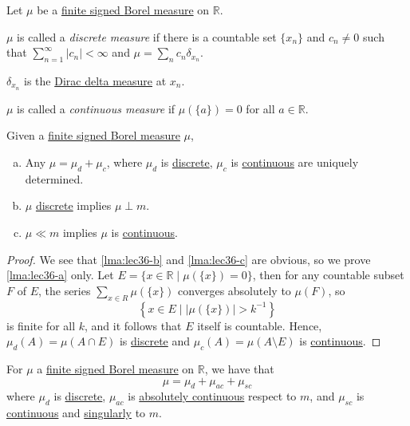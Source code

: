 \begin{definition*}
	Let \(\mu\) be a \hyperref[def:finite-signed-measure]{finite signed \hyperref[def:Borel-measure]{Borel measure}} on \(\mathbb{R}\).
	\begin{definition}\label{def:discrete-measure}
		\(\mu\) is called a \emph{discrete measure} if there is a countable set \(\{x_n\}\) and \(c_n \neq 0\) such that \(\sum_{n=1}^\infty \left\vert c_n \right\vert < \infty\)
		and \(\mu = \sum_n c_n \delta_{x_n}\).
		\begin{note}
			\(\delta_{x_n}\) is the \hyperref[eg:Dirac-delta-measure]{Dirac delta measure} at \(x_n\).
		\end{note}
	\end{definition}
	\begin{definition}\label{def:continuous-measure}
		\(\mu\) is called a \emph{continuous measure} if \(\mu(\{a\}) = 0\) for all \(a \in \mathbb{R}\).
	\end{definition}
\end{definition*}

\begin{lemma}\label{lma:lec36}
	Given a \hyperref[def:finite-signed-measure]{finite signed \hyperref[def:Borel-measure]{Borel measure}} \(\mu\),
	\begin{enumerate}[(a)]
		\item\label{lma:lec36-a} Any \(\mu = \mu_d + \mu_c\), where \(\mu_d\) is \hyperref[def:discrete-measure]{discrete}, \(\mu_c\) is \hyperref[def:continuous-measure]{continuous} are uniquely determined.
		\item\label{lma:lec36-b} \(\mu\) \hyperref[def:discrete-measure]{discrete} implies \(\mu \perp m\).
		\item\label{lma:lec36-c} \(\mu \ll m\) implies \(\mu\) is \hyperref[def:continuous-measure]{continuous}.
	\end{enumerate}
\end{lemma}
\begin{proof}
	We see that \autoref{lma:lec36-b} and \autoref{lma:lec36-c} are obvious, so we prove \autoref{lma:lec36-a} only. Let \(E = \{x\in \mathbb{R} \mid \mu (\{x\}) = 0\}\), then for any countable subset \(F\) of \(E\), the series \(\sum_{x\in R}^{} \mu (\{x\})\) converges absolutely to \(\mu (F)\), so
	\[
		\left\{x\in E\mid \left\vert \mu (\{x\}) \right\vert > k^{-1} \right\}
	\]
	is finite for all \(k\), and it follows that \(E\) itself is countable. Hence, \(\mu _{d} (A) = \mu (A \cap E)\) is \hyperref[def:discrete-measure]{discrete} and \(\mu _{c} (A) = \mu (A \setminus E)\) is \hyperref[def:continuous-measure]{continuous}.
\end{proof}

\begin{corollary}
	For \(\mu \) a \hyperref[def:finite-signed-measure]{finite signed \hyperref[def:Borel-measure]{Borel measure}} on \(\mathbb{R}\), we have that
	\[
		\mu = \mu_d + \mu_{ac} + \mu_{sc}
	\]
	where \(\mu_d\) is \hyperref[def:discrete-measure]{discrete}, \(\mu_{ac}\) is \hyperref[def:absolutely-continuous-function]{absolutely continuous} respect to \(m\), and \(\mu_{sc}\) is \hyperref[def:continuous-measure]{continuous} and \hyperref[def:singular]{singularly} to \(m\).
\end{corollary}